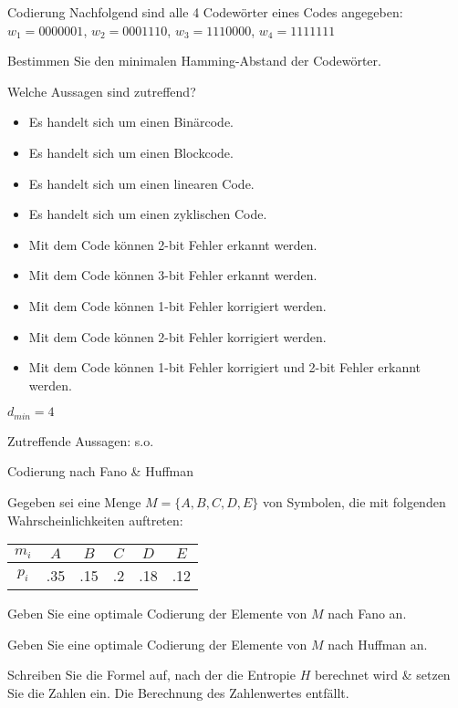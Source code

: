 \documentclass{exercisesheet}
\begin{document}
\begin{eexercises}{Codierung}{
    Nachfolgend sind alle 4 Codewörter eines Codes angegeben:
    \centering $w_1 = 0000001$, $w_2 = 0001110$, $w_3 = 1110000$, $w_4 = 1111111$
  }
  \item Bestimmen Sie den minimalen Hamming-Abstand der Codewörter.
  \item Welche Aussagen sind zutreffend?
  \begin{itemize}
    \item Es handelt sich um einen Binärcode. \psolution{\checkmark}
    \item Es handelt sich um einen Blockcode. \psolution{\checkmark}
    \item Es handelt sich um einen linearen Code. \psolution{\xmark}
    \item Es handelt sich um einen zyklischen Code. \psolution{\checkmark}
    \item Mit dem Code können 2-bit Fehler erkannt werden. \psolution{\checkmark}
    \item Mit dem Code können 3-bit Fehler erkannt werden. \psolution{\checkmark}
    \item Mit dem Code können 1-bit Fehler korrigiert werden. \psolution{\checkmark}
    \item Mit dem Code können 2-bit Fehler korrigiert werden. \psolution{\xmark}
    \item Mit dem Code können 1-bit Fehler korrigiert und 2-bit Fehler erkannt werden. \psolution{\checkmark}
  \end{itemize}
\end{eexercises}

\begin{solutions}
  \item $d_{min} = 4$
  \item Zutreffende Aussagen: s.o.
\end{solutions}

\begin{eexercises}{Codierung nach Fano \& Huffman}{
    Gegeben sei eine Menge $M = \{A, B, C, D, E\}$ von Symbolen, die mit folgenden Wahrscheinlichkeiten auftreten:
    \centering\begin{tabular}{c|ccccc}
      $m_i$ & $A$ & $B$ & $C$ & $D$ & $E$ \\
      \hline
      $p_i$ & .35 & .15 & .2  & .18 & .12 \\
    \end{tabular}
  }
  \item Geben Sie eine optimale Codierung der Elemente von $M$ nach Fano an.
  \item Geben Sie eine optimale Codierung der Elemente von $M$ nach Huffman an.
  \item Schreiben Sie die Formel auf, nach der die Entropie $H$ berechnet wird \& setzen Sie die Zahlen ein. Die Berechnung des Zahlenwertes entfällt.
\end{eexercises}
\end{document}
